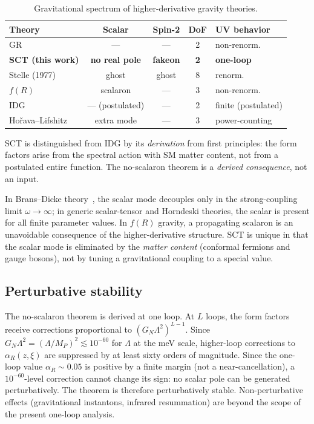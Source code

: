 \documentclass[12pt,a4paper]{article}
\newcommand{\Lam}{\Lambda}
\newcommand{\alphaR}{\alpha_R}
\begin{document}
\begin{table}[H]
\centering
\caption{Gravitational spectrum of higher-derivative gravity theories.}
\label{tab:comparison}
\begin{tabular}{lcccl}
\toprule
Theory & Scalar & Spin-2 & DoF & UV behavior \\
\midrule
GR & --- & --- & 2 & non-renorm. \\
\textbf{SCT (this work)} & \textbf{no real pole} & \textbf{fakeon} & \textbf{2} & \textbf{one-loop} \\
Stelle (1977) & ghost & ghost & 8 & renorm. \\
$f(R)$ & scalaron & --- & 3 & non-renorm. \\
IDG & --- (postulated) & --- & 2 & finite (postulated) \\
Ho\v{r}ava--Lifshitz & extra mode & --- & 3 & power-counting \\
\bottomrule
\end{tabular}
\end{table}

SCT is distinguished from IDG by its \emph{derivation} from first
principles: the form factors arise from the spectral action with
SM matter content, not from a postulated entire function. The
no-scalaron theorem is a \emph{derived consequence}, not an input.

In Brans--Dicke theory~\cite{BransDicke}, the scalar mode decouples
only in the strong-coupling limit $\omega \to \infty$; in generic
scalar-tensor and Horndeski theories, the scalar is present for all
finite parameter values. In $f(R)$ gravity, a propagating scalaron
is an unavoidable consequence of the higher-derivative structure.
SCT is unique in that the scalar mode is eliminated by the
\emph{matter content} (conformal fermions and gauge bosons), not by
tuning a gravitational coupling to a special value.


\subsection{Perturbative stability}

The no-scalaron theorem is derived at one loop. At $L$ loops, the
form factors receive corrections proportional to $(G_N \Lam^2)^{L-1}$.
Since $G_N \Lam^2 = (\Lam/M_P)^2 \lesssim 10^{-60}$ for $\Lam$ at
the meV scale, higher-loop corrections to $\alphaR(z,\xi)$ are
suppressed by at least sixty orders of magnitude. Since the one-loop
value $\alphaR \sim 0.05$ is positive by a finite margin (not a
near-cancellation), a $10^{-60}$-level correction cannot change its
sign: no scalar pole can be generated perturbatively. The theorem is
therefore perturbatively stable. Non-perturbative effects
(gravitational instantons, infrared resummation) are beyond the
scope of the present one-loop analysis.
\end{document}
